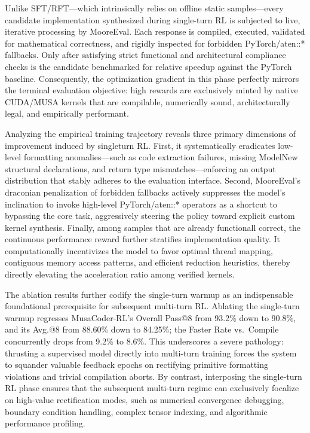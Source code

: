\documentclass[
  10
]{article}
\begin{document}
Unlike SFT/RFT---which intrinsically relies on offline static
samples---every candidate implementation synthesized during single-turn
RL is subjected to live, iterative processing by MooreEval. Each
response is compiled, executed, validated for mathematical correctness,
and rigidly inspected for forbidden PyTorch/aten::* fallbacks. Only
after satisfying strict functional and architectural compliance checks
is the candidate benchmarked for relative speedup against the PyTorch
baseline. Consequently, the optimization gradient in this phase
perfectly mirrors the terminal evaluation objective: high rewards are
exclusively minted by native CUDA/MUSA kernels that are compilable,
numerically sound, architecturally legal, and empirically performant.

Analyzing the empirical training trajectory reveals three primary
dimensions of improvement induced by singleturn RL. First, it
systematically eradicates low-level formatting anomalies---such as code
extraction failures, missing ModelNew structural declarations, and
return type mismatches---enforcing an output distribution that stably
adheres to the evaluation interface. Second, MooreEval's draconian
penalization of forbidden fallbacks actively suppresses the model's
inclination to invoke high-level PyTorch/aten::* operators as a shortcut
to bypassing the core task, aggressively steering the policy toward
explicit custom kernel synthesis. Finally, among samples that are
already functionall correct, the continuous performance reward further
stratifies implementation quality. It computationally incentivizes the
model to favor optimal thread mapping, contiguous memory access
patterns, and efficient reduction heuristics, thereby directly elevating
the acceleration ratio among verified kernels.

The ablation results further codify the single-turn warmup as an
indispensable foundational prerequisite for subsequent multi-turn RL.
Ablating the single-turn warmup regresses MusaCoder-RL's Overall Pass@8
from 93.2\% down to 90.8\%, and its Avg.@8 from 88.60\% down to 84.25\%;
the Faster Rate vs.~Compile concurrently drops from 9.2\% to 8.6\%. This
underscores a severe pathology: thrusting a supervised model directly
into multi-turn training forces the system to squander valuable feedback
epochs on rectifying primitive formatting violations and trivial
compilation aborts. By contrast, interposing the single-turn RL phase
ensures that the subsequent multi-turn regime can exclusively focalize
on high-value rectification modes, such as numerical convergence
debugging, boundary condition handling, complex tensor indexing, and
algorithmic performance profiling.
\end{document}
